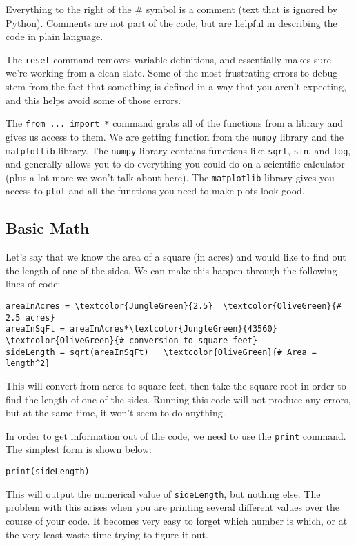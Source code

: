 Everything to the right of the \# symbol is a comment (text that is ignored by Python).  Comments are not part of the code, but are helpful in describing the code in plain language.

The \texttt{reset} command removes variable definitions, and essentially makes sure we're working from a clean slate.  Some of the most frustrating errors to debug stem from the fact that something is defined in a way that you aren't expecting, and this helps avoid some of those errors.

The \texttt{from ... import *} command grabs all of the functions from a library and gives us access to them.  We are getting function from the \texttt{numpy} library and the \texttt{matplotlib} library.  The \texttt{numpy} library contains functions like \texttt{sqrt}, \texttt{sin}, and \texttt{log}, and generally allows you to do everything you could do on a scientific calculator (plus a lot more we won't talk about here).  The \texttt{matplotlib} library gives you access to \texttt{plot} and all the functions you need to make plots look good.

\subsection{Basic Math} \label{sec:pythonBasics}

Let's say that we know the area of a square (in acres) and would like to find out the length of one of the sides.  We can make this happen through the following lines of code:

\begin{Verbatim}[commandchars=\\\{\}]
areaInAcres = \textcolor{JungleGreen}{2.5}  \textcolor{OliveGreen}{# 2.5 acres}
areaInSqFt = areaInAcres*\textcolor{JungleGreen}{43560}  \textcolor{OliveGreen}{# conversion to square feet}
sideLength = sqrt(areaInSqFt)   \textcolor{OliveGreen}{# Area = length^2}
\end{Verbatim}

This will convert from acres to square feet, then take the square root in order to find the length of one of the sides.  Running this code will not produce any errors, but at the same time, it won't seem to do anything.

In order to get information out of the code, we need to use the \texttt{print} command.  The simplest form is shown below:
\begin{Verbatim}[commandchars=\\\{\}]
print(sideLength)
\end{Verbatim}
This will output the numerical value of \texttt{sideLength}, but nothing else.  The problem with this arises when you are printing several different values over the course of your code.  It becomes very easy to forget which number is which, or at the very least waste time trying to figure it out.

